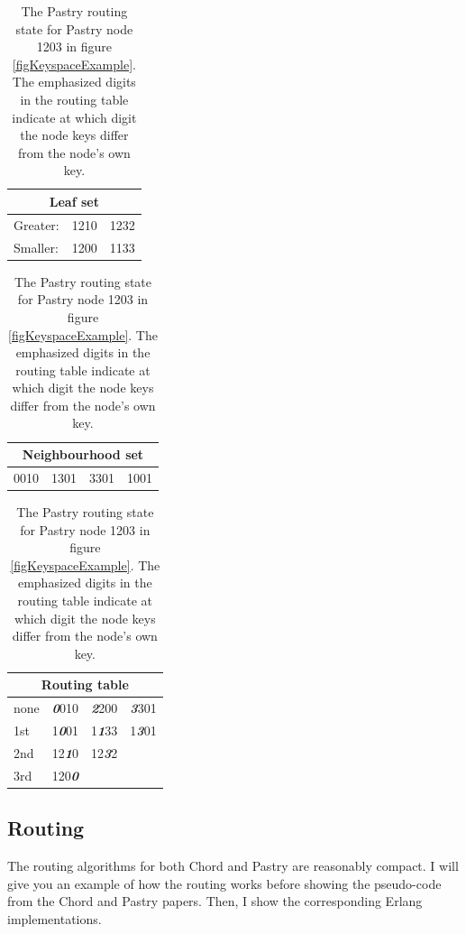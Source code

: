 \begin{table}[!htb]
\caption{The Pastry routing state for Pastry node 1203 in figure \ref{figKeyspaceExample}. The emphasized digits in the routing table indicate at which digit the node keys differ from the node's own key.}
\begin{center}
\begin{tabular}{ | l | l | l | }
  \hline
  \multicolumn{3}{|c|}{Leaf set} \\ 
  \hline
  \hline                       
  Greater: & 1210 & 1232 \\
  \hline                       
  Smaller: & 1200 & 1133 \\
  \hline                       
\end{tabular}
\begin{tabular}{ | l | l | l | l | }
  \hline                       
  \multicolumn{4}{|c|}{Neighbourhood set} \\ 
  \hline
  \hline                       
  0010 & 1301 & 3301 & 1001 \\
  \hline                       
\end{tabular}
\begin{tabular}{ | l | l | l | l | }
  \hline                       
  \multicolumn{4}{|c|}{Routing table} \\ 
  \hline
  \hline                       
  \cellcolor{green} none & \emph{\textbf{0}}010 & \emph{\textbf{2}}200 & \emph{\textbf{3}}301 \\
  \hline                       
  \cellcolor{green} 1st & 1\emph{\textbf{0}}01 & 1\emph{\textbf{1}}33 & 1\emph{\textbf{3}}01 \\
  \hline                       
  \cellcolor{green} 2nd & 12\emph{\textbf{1}}0 & 12\emph{\textbf{3}}2 & \\
  \hline                       
  \cellcolor{green} 3rd & 120\emph{\textbf{0}} & & \\
  \hline                       
\end{tabular}
\end{center}
\label{tablePastryRoutingTableImpl}
\end{table}

\subsection{Routing}
The routing algorithms for both Chord and Pastry are reasonably compact. I will give you an example of how the routing works before showing the pseudo-code from the Chord \cite{chord} and Pastry \cite{pastry} papers. Then, I show the corresponding Erlang implementations.

